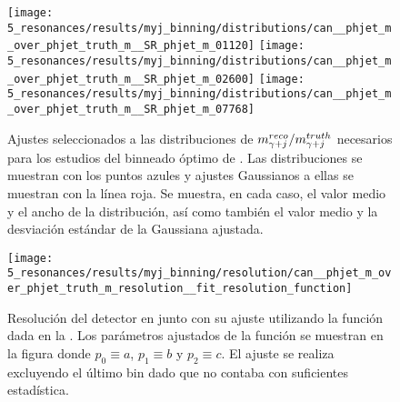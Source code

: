 \begin{figure}[ht!]
    \centering
    \texttt{[image: 5\_resonances/results/myj\_binning/distributions/can\_\_phjet\_m\_over\_phjet\_truth\_m\_\_SR\_phjet\_m\_01120]}
    \hfill
    \texttt{[image: 5\_resonances/results/myj\_binning/distributions/can\_\_phjet\_m\_over\_phjet\_truth\_m\_\_SR\_phjet\_m\_02600]}
    \hfill
    \texttt{[image: 5\_resonances/results/myj\_binning/distributions/can\_\_phjet\_m\_over\_phjet\_truth\_m\_\_SR\_phjet\_m\_07768]}
    \caption{Ajustes seleccionados a las distribuciones de \(m_{\gamma+j}^{reco} / m_{\gamma+j}^{truth}\) necesarios para los estudios del binneado óptimo de \myj. Las distribuciones se muestran con los puntos azules y ajustes Gaussianos a ellas se muestran con la línea roja. Se muestra, en cada caso, el valor medio y el ancho de la distribución, así como también el valor medio y la desviación estándar de la Gaussiana ajustada.}
    \label{fig:results:obs:ratio_fits}
\end{figure}

\begin{figure}[ht!]
    \centering
    \texttt{[image: 5\_resonances/results/myj\_binning/resolution/can\_\_phjet\_m\_over\_phjet\_truth\_m\_resolution\_\_fit\_resolution\_function]}
    \caption{Resolución del detector en \myj junto con su ajuste utilizando la función dada en la \Eqn{\ref{eq:results:obs:binning_resolution}}. Los parámetros ajustados de la función se muestran en la figura donde \(p_0 \equiv a\), \(p_1 \equiv b\) y \(p_2 \equiv c\). El ajuste se realiza excluyendo el último bin dado que no contaba con suficientes estadística.}
    \label{fig:results:obs:resolution_curve}
\end{figure}

